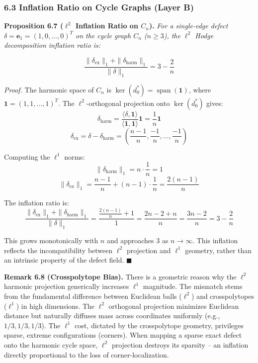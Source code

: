 \documentclass[
]{article}
\begin{document}
\subsubsection{\texorpdfstring{6.3 Inflation Ratio on Cycle Graphs
\textbf{(Layer
B)}}{6.3 Inflation Ratio on Cycle Graphs (Layer B)}}\label{inflation-ratio-on-cycle-graphs-layer-b}

\textbf{Proposition 6.7 (\(\ell^2\) Inflation Ratio on \(C_n\)).}
\emph{For a single-edge defect
\(\delta = \mathbf{e}_1 = (1, 0, \ldots, 0)^T\) on the cycle graph
\(C_n\) (\(n \geq 3\)), the \(\ell^2\) Hodge decomposition inflation
ratio is:}

\[ \frac{\|\delta_{\text{ex}}\|_1 + \|\delta_{\text{harm}}\|_1}{\|\delta\|_1} = 3 - \frac{2}{n} \]

\emph{Proof.} The harmonic space of \(C_n\) is
\(\ker(d_0^*) = \operatorname{span}(\mathbf{1})\), where
\(\mathbf{1} = (1,1,\ldots,1)^T\). The \(\ell^2\)-orthogonal projection
onto \(\ker(d_0^*)\) gives:
\[\delta_{\text{harm}} = \frac{\langle \delta, \mathbf{1} \rangle}{\langle \mathbf{1}, \mathbf{1} \rangle} \mathbf{1} = \frac{1}{n}\mathbf{1}\]
\[\delta_{\text{ex}} = \delta - \delta_{\text{harm}} = \left(\frac{n-1}{n}, \frac{-1}{n}, \ldots, \frac{-1}{n}\right)\]

Computing the \(\ell^1\) norms:
\[\|\delta_{\text{harm}}\|_1 = n \cdot \frac{1}{n} = 1\]
\[\|\delta_{\text{ex}}\|_1 = \frac{n-1}{n} + (n-1) \cdot \frac{1}{n} = \frac{2(n-1)}{n}\]

The inflation ratio is:
\[\frac{\|\delta_{\text{ex}}\|_1 + \|\delta_{\text{harm}}\|_1}{\|\delta\|_1} = \frac{\frac{2(n-1)}{n} + 1}{1} = \frac{2n - 2 + n}{n} = \frac{3n - 2}{n} = 3 - \frac{2}{n}\]

This grows monotonically with \(n\) and approaches 3 as
\(n \to \infty\). This inflation reflects the incompatibility between
\(\ell^2\) projection and \(\ell^1\) geometry, rather than an intrinsic
property of the defect field. \(\blacksquare\)

\textbf{Remark 6.8 (Crosspolytope Bias).} There is a geometric reason
why the \(\ell^2\) harmonic projection generically increases \(\ell^1\)
magnitude. The mismatch stems from the fundamental difference between
Euclidean balls (\(\ell^2\)) and crosspolytopes (\(\ell^1\)) in high
dimensions. The \(\ell^2\) orthogonal projection minimizes Euclidean
distance but naturally diffuses mass across coordinates uniformly (e.g.,
\(1/3, 1/3, 1/3\)). The \(\ell^1\) cost, dictated by the crosspolytope
geometry, privileges sparse, extreme configurations (corners). When
mapping a sparse exact defect onto the harmonic cycle space, \(\ell^2\)
projection destroys its sparsity -- an inflation directly proportional
to the loss of corner-localization.
\end{document}
